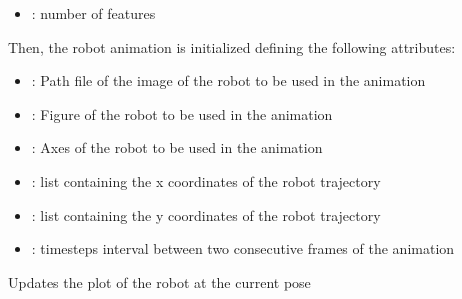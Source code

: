\documentclass[letterpaper,10pt,english]{sphinxmanual}
\begin{document}
\begin{fulllineitems}
\begin{fulllineitems}
\begin{itemize}
\item {} 
\sphinxAtStartPar
{} : number of features

\end{itemize}

\sphinxAtStartPar
Then, the robot animation is initialized defining the following attributes:
\begin{itemize}
\item {} 
\sphinxAtStartPar
{} : Path file of the image of the robot to be used in the animation

\item {} 
\sphinxAtStartPar
{} : Figure of the robot to be used in the animation

\item {} 
\sphinxAtStartPar
{} : Axes of the robot to be used in the animation

\item {} 
\sphinxAtStartPar
{} : list containing the x coordinates of the robot trajectory

\item {} 
\sphinxAtStartPar
{} : list containing the y coordinates of the robot trajectory

\item {} 
\sphinxAtStartPar
{} : time\sphinxhyphen{}steps interval between two consecutive frames of the animation

\end{itemize}

\end{fulllineitems}


\begin{fulllineitems}
\label{\detokenize{robot_simulation:SimulatedRobot.SimulatedRobot.PlotRobot}}
\pysigstartsignatures
{}
\pysigstopsignatures
\sphinxAtStartPar
Updates the plot of the robot at the current pose

\end{fulllineitems}



\end{fulllineitems}
\end{document}
